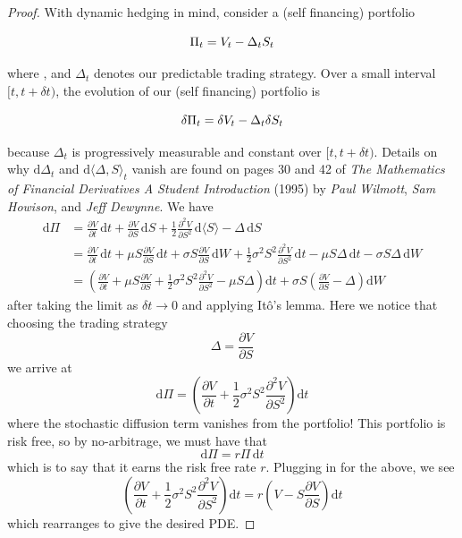 \documentclass[12pt]{article}
\theoremstyle{definition}
\theoremstyle{remark}
\begin{document}
\begin{proof}
	With dynamic hedging in mind, consider a (self financing) portfolio
	$$
	\vphantom{\int} \Pi_t = V_t - \Delta_t S_t
	$$
	where , and $\Delta_t$ denotes our predictable trading strategy. Over a small interval $[t,t+\delta t)$, the evolution of our (self financing) portfolio is
	$$
	\vphantom{\int} \delta \Pi_t = \delta V_t - \Delta_t \delta S_t
	$$
	because $\Delta_t$ is progressively measurable and constant over $[t,t+\delta t)$. Details on why $\mathrm{d}\Delta_t$ and $\mathrm{d} \langle \Delta, S\rangle_t$ vanish are found on pages 30 and 42 of {\emph{The Mathematics of Financial Derivatives A Student Introduction}} (1995) by {\emph{Paul Wilmott}}, {\emph{Sam Howison}}, and {\emph{Jeff Dewynne}}. We have
	\begin{align*}
		\mathrm{d}\Pi
		&= \frac{\partial V}{\partial t} \, \mathrm{d}t + \frac{\partial V}{\partial S} \, \mathrm{d}S + \frac{1}{2} \frac{\partial^{2}V}{\partial S^{2}} \, \mathrm{d} \langle S \rangle - \Delta \, \mathrm{d} S \\
		&= \frac{\partial V}{\partial t} \, \mathrm{d}t + \mu S \frac{\partial V}{\partial S} \,\mathrm{d}t + \sigma S \frac{\partial V}{\partial S} \,\mathrm{d} W + \frac{1}{2} \sigma^2 S^2 \frac{\partial^{2}V}{\partial S^{2}}\,\mathrm{d}t - \mu S \Delta \,\mathrm{d}t - \sigma S \Delta \,\mathrm{d} W \\
		&= \left( \frac{\partial V}{\partial t} + \mu S \frac{\partial V}{\partial S} + \frac{1}{2} \sigma^2 S^2 \frac{\partial^{2}V}{\partial S^{2}} - \mu S \Delta  \right) \mathrm{d}t + \sigma S \left( \frac{\partial V}{\partial S} - \Delta \right) \mathrm{d} W
	\end{align*}
	after taking the limit as $\delta t \rightarrow 0$ and applying It\^o's lemma. Here we notice that choosing the trading strategy
	$$
	\Delta = \frac{\partial V}{\partial S}
	$$
	we arrive at
	$$
	\mathrm{d}\Pi = \left(\frac{\partial V}{\partial t} + \frac{1}{2} \sigma^2 S^2 \frac{\partial^{2}V}{\partial S^{2}} \right) \mathrm{d}t
	$$
	where the stochastic diffusion term vanishes from the portfolio! This portfolio is risk free, so by no-arbitrage, we must have that
	$$
	\mathrm{d}\Pi = r\Pi \, \mathrm{d}t
	$$
	which is to say that it earns the risk free rate $r$. Plugging in for the above, we see
	$$
	\left(\frac{\partial V}{\partial t} + \frac{1}{2} \sigma^2 S^2 \frac{\partial^{2}V}{\partial S^{2}} \right) \mathrm{d}t = r \left( V - S \frac{\partial V}{\partial S} \right) \mathrm{d}t
	$$
	which rearranges to give the desired PDE.
\end{proof}
\end{document}
